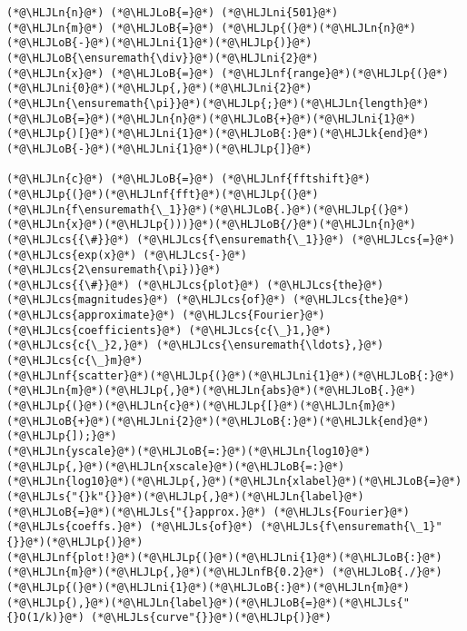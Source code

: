 \documentclass[12pt,a4paper]{article}
\newcommand{\HLJLk}[1]{\textcolor[RGB]{148,91,176}{\textbf{#1}}}
\newcommand{\HLJLn}[1]{#1}
\newcommand{\HLJLnf}[1]{\textcolor[RGB]{66,102,213}{#1}}
\newcommand{\HLJLs}[1]{\textcolor[RGB]{201,61,57}{#1}}
\newcommand{\HLJLnfB}[1]{\textcolor[RGB]{59,151,46}{#1}}
\newcommand{\HLJLni}[1]{\textcolor[RGB]{59,151,46}{#1}}
\newcommand{\HLJLoB}[1]{\textcolor[RGB]{102,102,102}{\textbf{#1}}}
\newcommand{\HLJLp}[1]{#1}
\newcommand{\HLJLcs}[1]{\textcolor[RGB]{153,153,119}{\textit{#1}}}
\begin{document}
\begin{lstlisting}
(*@\HLJLn{n}@*) (*@\HLJLoB{=}@*) (*@\HLJLni{501}@*)
(*@\HLJLn{m}@*) (*@\HLJLoB{=}@*) (*@\HLJLp{(}@*)(*@\HLJLn{n}@*)(*@\HLJLoB{-}@*)(*@\HLJLni{1}@*)(*@\HLJLp{)}@*)(*@\HLJLoB{\ensuremath{\div}}@*)(*@\HLJLni{2}@*)
(*@\HLJLn{x}@*) (*@\HLJLoB{=}@*) (*@\HLJLnf{range}@*)(*@\HLJLp{(}@*)(*@\HLJLni{0}@*)(*@\HLJLp{,}@*)(*@\HLJLni{2}@*)(*@\HLJLn{\ensuremath{\pi}}@*)(*@\HLJLp{;}@*)(*@\HLJLn{length}@*)(*@\HLJLoB{=}@*)(*@\HLJLn{n}@*)(*@\HLJLoB{+}@*)(*@\HLJLni{1}@*)(*@\HLJLp{)[}@*)(*@\HLJLni{1}@*)(*@\HLJLoB{:}@*)(*@\HLJLk{end}@*)(*@\HLJLoB{-}@*)(*@\HLJLni{1}@*)(*@\HLJLp{]}@*)

(*@\HLJLn{c}@*) (*@\HLJLoB{=}@*) (*@\HLJLnf{fftshift}@*)(*@\HLJLp{(}@*)(*@\HLJLnf{fft}@*)(*@\HLJLp{(}@*)(*@\HLJLn{f\ensuremath{\_1}}@*)(*@\HLJLoB{.}@*)(*@\HLJLp{(}@*)(*@\HLJLn{x}@*)(*@\HLJLp{)))}@*)(*@\HLJLoB{/}@*)(*@\HLJLn{n}@*)   (*@\HLJLcs{{\#}}@*) (*@\HLJLcs{f\ensuremath{\_1}}@*) (*@\HLJLcs{=}@*) (*@\HLJLcs{exp(x}@*) (*@\HLJLcs{-}@*) (*@\HLJLcs{2\ensuremath{\pi})}@*)
(*@\HLJLcs{{\#}}@*) (*@\HLJLcs{plot}@*) (*@\HLJLcs{the}@*) (*@\HLJLcs{magnitudes}@*) (*@\HLJLcs{of}@*) (*@\HLJLcs{the}@*) (*@\HLJLcs{approximate}@*) (*@\HLJLcs{Fourier}@*) (*@\HLJLcs{coefficients}@*) (*@\HLJLcs{c{\_}1,}@*) (*@\HLJLcs{c{\_}2,}@*) (*@\HLJLcs{\ensuremath{\ldots},}@*) (*@\HLJLcs{c{\_}m}@*) 
(*@\HLJLnf{scatter}@*)(*@\HLJLp{(}@*)(*@\HLJLni{1}@*)(*@\HLJLoB{:}@*)(*@\HLJLn{m}@*)(*@\HLJLp{,}@*)(*@\HLJLn{abs}@*)(*@\HLJLoB{.}@*)(*@\HLJLp{(}@*)(*@\HLJLn{c}@*)(*@\HLJLp{[}@*)(*@\HLJLn{m}@*)(*@\HLJLoB{+}@*)(*@\HLJLni{2}@*)(*@\HLJLoB{:}@*)(*@\HLJLk{end}@*)(*@\HLJLp{]);}@*) 
(*@\HLJLn{yscale}@*)(*@\HLJLoB{=:}@*)(*@\HLJLn{log10}@*)(*@\HLJLp{,}@*)(*@\HLJLn{xscale}@*)(*@\HLJLoB{=:}@*)(*@\HLJLn{log10}@*)(*@\HLJLp{,}@*)(*@\HLJLn{xlabel}@*)(*@\HLJLoB{=}@*)(*@\HLJLs{"{}k"{}}@*)(*@\HLJLp{,}@*)(*@\HLJLn{label}@*)(*@\HLJLoB{=}@*)(*@\HLJLs{"{}approx.}@*) (*@\HLJLs{Fourier}@*) (*@\HLJLs{coeffs.}@*) (*@\HLJLs{of}@*) (*@\HLJLs{f\ensuremath{\_1}"{}}@*)(*@\HLJLp{)}@*)
(*@\HLJLnf{plot!}@*)(*@\HLJLp{(}@*)(*@\HLJLni{1}@*)(*@\HLJLoB{:}@*)(*@\HLJLn{m}@*)(*@\HLJLp{,}@*)(*@\HLJLnfB{0.2}@*) (*@\HLJLoB{./}@*)(*@\HLJLp{(}@*)(*@\HLJLni{1}@*)(*@\HLJLoB{:}@*)(*@\HLJLn{m}@*)(*@\HLJLp{),}@*)(*@\HLJLn{label}@*)(*@\HLJLoB{=}@*)(*@\HLJLs{"{}O(1/k)}@*) (*@\HLJLs{curve"{}}@*)(*@\HLJLp{)}@*)


\end{lstlisting}
\end{document}
